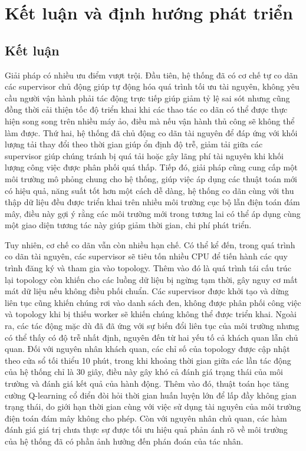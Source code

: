 \chapter{Kết luận và định hướng phát triển}

\section{Kết luận}

Giải pháp \tenKL có nhiều ưu điểm vượt trội. Đầu tiên, hệ thống đã có cơ chế tự co dãn các supervisor chủ động giúp tự động hóa quá trình tối ưu tài nguyên, không yêu cầu người vận hành phải tác động trực tiếp giúp giảm tỷ lệ sai sót nhưng cũng đồng thời cải thiện tốc độ triển khai khi các thao tác co dãn có thể được thực hiện song song trên nhiều máy ảo, điều mà nếu vận hành thủ công sẽ không thể làm được. Thứ hai, hệ thống đã chủ động co dãn tài nguyên để đáp ứng với khối lượng tải thay đổi theo thời gian giúp ổn định độ trễ, giảm tải giữa các supervisor giúp chúng tránh bị quá tải hoặc gây lãng phí tài nguyên khi khối lượng công việc được phân phối quá thấp. Tiếp đó, giải pháp cũng cung cấp một môi trường mô phỏng chung cho hệ thống, giúp việc áp dụng các thuật toán mới có hiệu quả, năng suất tốt hơn một cách dễ dàng, hệ thống co dãn cùng với thu thập dữ liệu đều được triển khai trên nhiều môi trường cục bộ lẫn điện toán đám mây, điều này gợi ý rằng các môi trường mới trong tương lai có thể áp dụng cùng một giao diện tương tác này giúp giảm thời gian, chi phí phát triển.

Tuy nhiên, cơ chế co dãn vẫn còn nhiều hạn chế. Có thể kể đến, trong quá trình co dãn tài nguyên, các supervisor sẽ tiêu tốn nhiều CPU để tiến hành các quy trình đăng ký và tham gia vào topology. Thêm vào đó là quá trình tái cấu trúc lại topology còn khiến cho các luồng dữ liệu bị ngừng tạm thời, gây nguy cơ mất mát dữ liệu nếu không điều phối chuẩn. Các supervisor được khởi tạo và dừng liên tục cũng khiến chúng rơi vào danh sách đen, không được phân phối công việc và topology khi bị thiếu worker sẽ khiến chúng không thể được triển khai. Ngoài ra, các tác động mặc dù đã đã ứng với sự biến đổi liên tục của môi trường nhưng có thể thấy có độ trễ nhất định, nguyên đến từ hai yếu tố cả khách quan lẫn chủ quan. Đối với nguyên nhân khách quan, các chỉ số của topology được cập nhật theo cửa sổ tối thiểu 10 phút, trong khi khoảng thời gian giữa các lần tác động của hệ thống chỉ là 30 giây, điều này gây khó cả đánh giá trạng thái của môi trường và đánh giá kết quả của hành động. Thêm vào đó, thuật toán học tăng cường Q-learning cổ điển đòi hỏi thời gian huấn luyện lớn để lấp đầy không gian trạng thái, do giới hạn thời gian cùng với việc sử dụng tài nguyên của môi trường điện toán đám mây không cho phép. Còn với nguyên nhân chủ quan, các hàm đánh giá giá trị chưa thực sự được tối ưu hiệu quả phản ánh rõ về môi trường của hệ thống đã có phần ảnh hưởng đến phán đoán của tác nhân.


